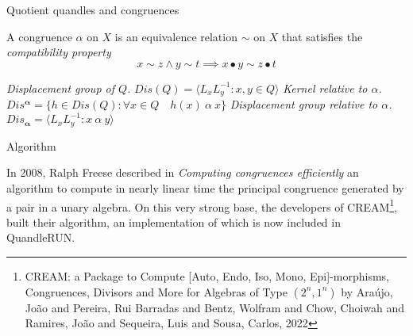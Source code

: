 \begin{frame}{Quotient quandles and congruences}
\small
\begin{definition}[Congruence]
A congruence $\alpha$ on $X$ is an equivalence relation $\sim$ on $X$ that satisfies the \emph{compatibility property}
\[ x \sim z \land y \sim t \implies x \bullet y \sim z \bullet t  \]
\end{definition}
\begin{definition}
\textit{Displacement group of $Q$.}\newline
$Dis(Q) = \langle L_xL_y^{-1} :  x,y \in Q \rangle$\newline\newline
\textit{Kernel relative to $\alpha$.}\newline
$Dis^{\mathbf{\alpha}} = \{ h \in Dis(Q) : \forall x \in Q \quad h(x)~\alpha~x  \}$\newline\newline
\textit{Displacement group relative to $\alpha$.}\newline
$Dis_{\mathbf{\alpha}} = \langle L_xL_y^{-1} :  x~\alpha~y\rangle$
\end{definition}
\end{frame}

\begin{frame}{Algorithm}
    
In 2008, Ralph Freese described in \textit{Computing congruences efficiently} an algorithm to compute in nearly linear time the principal congruence generated by a pair in a unary algebra. On this very strong base, the developers of CREAM\footnote{CREAM: a Package to Compute [Auto, Endo, Iso, Mono, Epi]-morphisms, Congruences, Divisors and More for Algebras of Type $(2^n, 1^n)$ by Ara{\'u}jo, Jo{\~a}o and Pereira, Rui Barradas and Bentz, Wolfram and Chow, Choiwah and Ramires, Jo{\~a}o and Sequeira, Luis and Sousa, Carlos, 2022\newline}, built their algorithm, an implementation of which is now included in QuandleRUN.

\end{frame}

